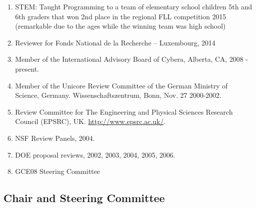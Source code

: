 \documentclass{article}
\begin{document}
\begin{enumerate}
\item  STEM: Taught Programming to a team of elementary school children 5th and 6th graders that won 2nd place in the regional FLL competition 2015 (remarkable due to the ages while the winning team was high school) 
\item  Reviewer for Fonds National de la Recherche – Luxembourg, 2014 
\item  Member of the International Advisory Board of Cybera, Alberta, CA, 2008 - present.
\item  Member of the Unicore Review Committee of the German Ministry of Science, Germany. Wissenschaftszentrum, Bonn, Nov. 27 2000-2002. 
\item  Review Committee for The Engineering and Physical Sciences Research Council (EPSRC), UK. \url{http://www.epsrc.ac.uk/}. 
\item  NSF Review Panels, 2004. 
\item  DOE proposal reviews, 2002, 2003, 2004, 2005, 2006. 
\item  GCE08 Steering Committee
\end{enumerate}
 
\subsection{Chair and Steering Committee} 
\end{document}
